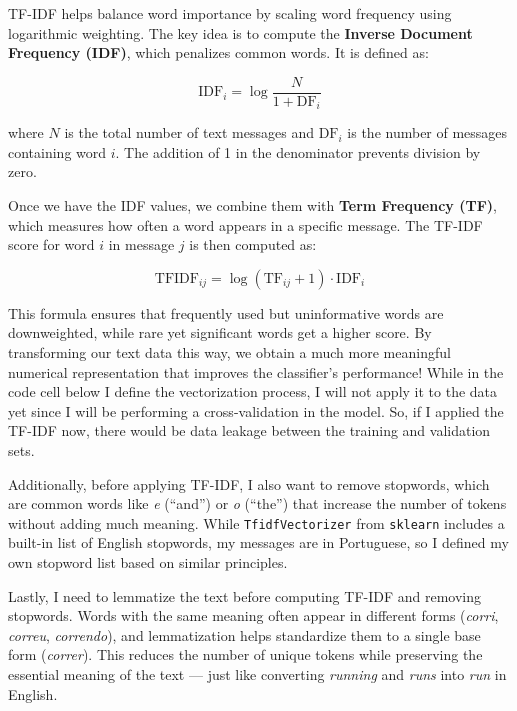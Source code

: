 \documentclass[11pt]{article}
\begin{document}
TF-IDF helps balance word importance by scaling word frequency using
logarithmic weighting. The key idea is to compute the \textbf{Inverse
Document Frequency (IDF)}, which penalizes common words. It is defined
as:

\begin{equation}
    \text{IDF}_i = \log \frac{N}{1 + \text{DF}_i}
\end{equation}

where \(N\) is the total number of text messages and \(\text{DF}_i\) is
the number of messages containing word \(i\). The addition of 1 in the
denominator prevents division by zero.

Once we have the IDF values, we combine them with \textbf{Term Frequency
(TF)}, which measures how often a word appears in a specific message.
The TF-IDF score for word \(i\) in message \(j\) is then computed as:

\begin{equation}
    \text{TFIDF}_{ij} = \log(\text{TF}_{ij} + 1) \cdot \text{IDF}_i
\end{equation}

This formula ensures that frequently used but uninformative words are
downweighted, while rare yet significant words get a higher score. By
transforming our text data this way, we obtain a much more meaningful
numerical representation that improves the classifier's performance!
While in the code cell below I define the vectorization process, I will
not apply it to the data yet since I will be performing a
cross-validation in the model. So, if I applied the TF-IDF now, there
would be data leakage between the training and validation sets.

Additionally, before applying TF-IDF, I also want to remove stopwords,
which are common words like \emph{e} (``and'') or \emph{o} (``the'')
that increase the number of tokens without adding much meaning. While
\texttt{TfidfVectorizer} from \texttt{sklearn} includes a built-in list
of English stopwords, my messages are in Portuguese, so I defined my own
stopword list based on similar principles.

Lastly, I need to lemmatize the text before computing TF-IDF and
removing stopwords. Words with the same meaning often appear in
different forms (\emph{corri}, \emph{correu}, \emph{correndo}), and
lemmatization helps standardize them to a single base form
(\emph{correr}). This reduces the number of unique tokens while
preserving the essential meaning of the text --- just like converting
\emph{running} and \emph{runs} into \emph{run} in English.
\end{document}
